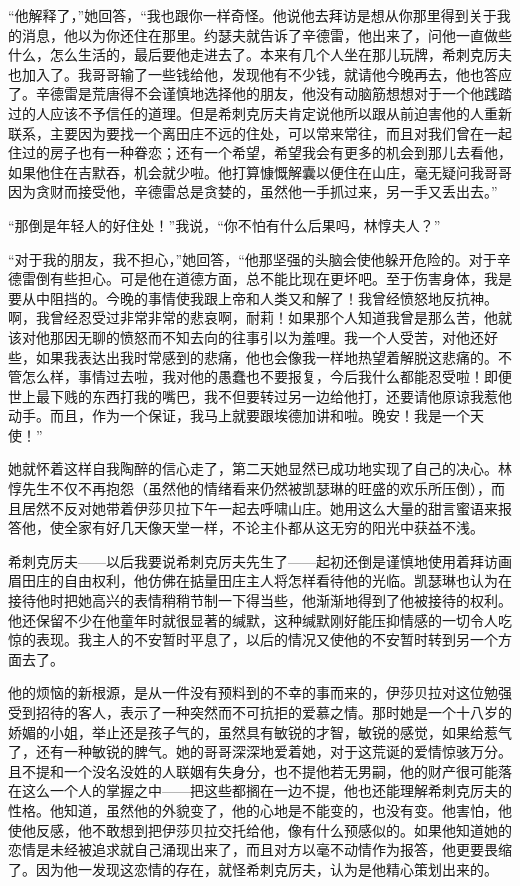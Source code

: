 \par “他解释了，”她回答，“我也跟你一样奇怪。他说他去拜访是想从你那里得到关于我的消息，他以为你还住在那里。约瑟夫就告诉了辛德雷，他出来了，问他一直做些什么，怎么生活的，最后要他走进去了。本来有几个人坐在那儿玩牌，希刺克厉夫也加入了。我哥哥输了一些钱给他，发现他有不少钱，就请他今晚再去，他也答应了。辛德雷是荒唐得不会谨慎地选择他的朋友，他没有动脑筋想想对于一个他践踏过的人应该不予信任的道理。但是希刺克厉夫肯定说他所以跟从前迫害他的人重新联系，主要因为要找一个离田庄不远的住处，可以常来常往，而且对我们曾在一起住过的房子也有一种眷恋；还有一个希望，希望我会有更多的机会到那儿去看他，如果他住在吉默吞，机会就少啦。他打算慷慨解囊以便住在山庄，毫无疑问我哥哥因为贪财而接受他，辛德雷总是贪婪的，虽然他一手抓过来，另一手又丢出去。”
\par “那倒是年轻人的好住处！”我说，“你不怕有什么后果吗，林惇夫人？”
\par “对于我的朋友，我不担心，”她回答，“他那坚强的头脑会使他躲开危险的。对于辛德雷倒有些担心。可是他在道德方面，总不能比现在更坏吧。至于伤害身体，我是要从中阻挡的。今晚的事情使我跟上帝和人类又和解了！我曾经愤怒地反抗神。啊，我曾经忍受过非常非常的悲哀啊，耐莉！如果那个人知道我曾是那么苦，他就该对他那因无聊的愤怒而不知去向的往事引以为羞哩。我一个人受苦，对他还好些，如果我表达出我时常感到的悲痛，他也会像我一样地热望着解脱这悲痛的。不管怎么样，事情过去啦，我对他的愚蠢也不要报复，今后我什么都能忍受啦！即便世上最下贱的东西打我的嘴巴，我不但要转过另一边给他打，还要请他原谅我惹他动手。而且，作为一个保证，我马上就要跟埃德加讲和啦。晚安！我是一个天使！”
\par 她就怀着这样自我陶醉的信心走了，第二天她显然已成功地实现了自己的决心。林惇先生不仅不再抱怨（虽然他的情绪看来仍然被凯瑟琳的旺盛的欢乐所压倒），而且居然不反对她带着伊莎贝拉下午一起去呼啸山庄。她用这么大量的甜言蜜语来报答他，使全家有好几天像天堂一样，不论主仆都从这无穷的阳光中获益不浅。
\par 希刺克厉夫——以后我要说希刺克厉夫先生了——起初还倒是谨慎地使用着拜访画眉田庄的自由权利，他仿佛在掂量田庄主人将怎样看待他的光临。凯瑟琳也认为在接待他时把她高兴的表情稍稍节制一下得当些，他渐渐地得到了他被接待的权利。他还保留不少在他童年时就很显著的缄默，这种缄默刚好能压抑情感的一切令人吃惊的表现。我主人的不安暂时平息了，以后的情况又使他的不安暂时转到另一个方面去了。
\par 他的烦恼的新根源，是从一件没有预料到的不幸的事而来的，伊莎贝拉对这位勉强受到招待的客人，表示了一种突然而不可抗拒的爱慕之情。那时她是一个十八岁的娇媚的小姐，举止还是孩子气的，虽然具有敏锐的才智，敏锐的感觉，如果给惹气了，还有一种敏锐的脾气。她的哥哥深深地爱着她，对于这荒诞的爱情惊骇万分。且不提和一个没名没姓的人联姻有失身分，也不提他若无男嗣，他的财产很可能落在这么一个人的掌握之中——把这些都搁在一边不提，他也还能理解希刺克厉夫的性格。他知道，虽然他的外貌变了，他的心地是不能变的，也没有变。他害怕，他使他反感，他不敢想到把伊莎贝拉交托给他，像有什么预感似的。如果他知道她的恋情是未经被追求就自己涌现出来了，而且对方以毫不动情作为报答，他更要畏缩了。因为他一发现这恋情的存在，就怪希刺克厉夫，认为是他精心策划出来的。
